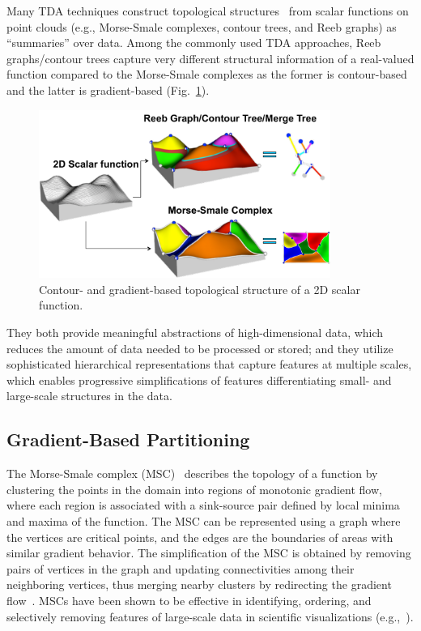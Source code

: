 Many TDA techniques construct topological structures~\cite{Reeb1946,Smale1961} from scalar functions on point clouds (e.g., Morse-Smale complexes, contour trees, and Reeb graphs) as ``summaries'' over data.
%
Among the commonly used TDA approaches, Reeb graphs/contour trees capture very different structural information of a real-valued function compared to the Morse-Smale complexes as the former is contour-based and the latter is gradient-based (Fig.~\ref{fig:topo-structure}).

\begin{figure}[!ht]
  \centering
  \includegraphics[width=0.85\textwidth]{figs/chap3/topostructure}
  \caption[Contour and Gradient-based Structures]{Contour- and gradient-based
  topological structure of a 2D scalar function.}
  \label{fig:topo-structure}
\end{figure}

They both provide meaningful abstractions of high-dimensional data, which reduces the amount of data needed to be processed or stored; and they utilize sophisticated hierarchical representations that capture features at multiple scales, which enables progressive simplifications of features differentiating small- and large-scale structures in the data.

\subsection{Gradient-Based Partitioning}
The Morse-Smale complex (MSC)~\cite{EdelsbrunnerHarerNatarajan2003,EdelsbrunnerHarerZomorodian2003} describes the topology of a function by clustering the points in the domain into regions of monotonic gradient flow, where each region is associated with a sink-source pair defined by local minima and maxima of the function.
%
The MSC can be represented using a graph where the vertices are critical points, and the edges are the boundaries of areas with similar gradient behavior.
%
The simplification of the MSC is obtained by removing pairs of vertices in the graph and updating connectivities among their neighboring vertices, thus merging nearby clusters by redirecting the gradient flow~\cite{ComicDeFloriani2011,GuntherReininghausSeidel2013,IuricichFugacciDeFloriani2015}.
%
MSCs have been shown to be effective in identifying, ordering, and selectively removing features of large-scale data in scientific visualizations (e.g.,~\cite{BremerEdelsbrunnerHamann2004,GyulassyBremerPascucci2008,GyulassyNatarajanPascucci2005}).

